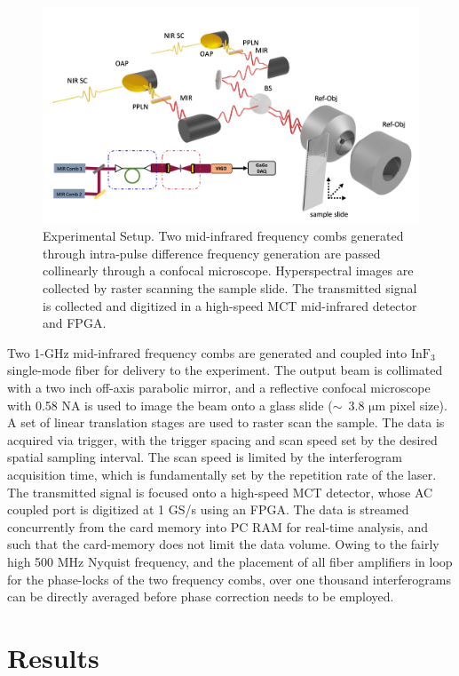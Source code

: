 \documentclass{optica-article}
\begin{document}
\begin{figure}[h]
    \centering
    \includegraphics[width=\linewidth]{setup_3D.png}
    \caption{Experimental Setup. Two mid-infrared frequency combs generated through intra-pulse difference frequency generation are passed collinearly through a confocal microscope. Hyperspectral images are collected by raster scanning the sample slide. The transmitted signal is collected and digitized in a high-speed MCT mid-infrared detector and FPGA.}
    \label{fig:setup}
\end{figure}

Two 1-GHz mid-infrared frequency combs are generated and coupled into $\mathrm{InF_3}$ single-mode fiber for delivery to the experiment. The output beam is collimated with a two inch off-axis parabolic mirror, and a reflective confocal microscope with 0.58 NA is used to image the beam onto a glass slide ($\sim$~3.8 $\mathrm{\mu m}$ pixel size). A set of linear translation stages are used to raster scan the sample. The data is acquired via trigger, with the trigger spacing and scan speed set by the desired spatial sampling interval. The scan speed is limited by the interferogram acquisition time, which is fundamentally set by the repetition rate of the laser. The transmitted signal is focused onto a high-speed MCT detector, whose AC coupled port is digitized at 1 GS/s using an FPGA. The data is streamed concurrently from the card memory into PC RAM for real-time analysis, and such that the card-memory does not limit the data volume. Owing to the fairly high 500 MHz Nyquist frequency, and the placement of all fiber amplifiers in loop for the phase-locks of the two frequency combs, over one thousand interferograms can be directly averaged before phase correction needs to be employed.

\section{Results}
\end{document}
